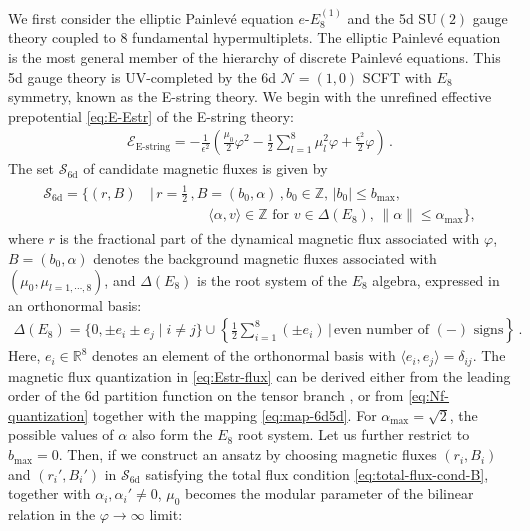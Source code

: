 \documentclass[11pt, a4paper]{article}
\theoremstyle{definition}
\begin{document}
We first consider the elliptic Painlev\'e equation $ e\text{-}E_8^{(1)} $ and the 5d $ \mathrm{SU}(2) $ gauge theory coupled to 8 fundamental hypermultiplets. The elliptic Painlev\'e equation is the most general member of the hierarchy of discrete Painlev\'e equations. This 5d gauge theory is UV-completed by the 6d $ \mathcal{N}=(1,0) $ SCFT with $ E_8 $ symmetry, known as the E-string theory. We begin with the unrefined effective prepotential \eqref{eq:E-Estr} of the E-string theory:
\begin{align}\label{eq:E-Estr2}
    \mathcal{E}_{\text{E-string}} = -\frac{1}{\epsilon^2} \left( \frac{\mu_0}{2} \varphi^2 - \frac{1}{2} \sum_{l=1}^8 \mu_l^2 \varphi + \frac{\epsilon^2}{2} \varphi \right) \, .
\end{align}
The set $ \mathcal{S}_{\text{6d}} $ of candidate magnetic fluxes is given by
\begin{align}\label{eq:Estr-flux}
    \begin{aligned}
        \mathcal{S}_{\text{6d}} = \bigg\{ (r, B) \, &\bigg| \, r = \frac{1}{2} \, , B=(b_0, \alpha) \, , b_0 \in \mathbb{Z} , \, |b_0| \leq b_{\mathrm{max}}, \\
        &\qquad \qquad \, \langle \alpha, v \rangle \in \mathbb{Z} \text{ for } v \in \Delta(E_8) , \, \lVert \alpha \rVert \leq \alpha_{\mathrm{max}} \bigg\} ,
    \end{aligned}
\end{align}
where $ r $ is the fractional part of the dynamical magnetic flux associated with $ \varphi $, $ B=(b_0, \alpha) $ denotes the background magnetic fluxes associated with $ (\mu_0, \mu_{l=1,\cdots,8}) $, and $ \Delta(E_8) $ is the root system of the $ E_8 $ algebra, expressed in an orthonormal basis:
\begin{align}
    \Delta(E_8) = \{ 0, \pm e_i \pm e_j \mid i\neq j \} \cup \left\{ \frac{1}{2} \sum_{i=1}^8 (\pm e_i ) \,\bigg|\, \text{even number of }(-) \text{ signs} \right\} \, .
\end{align}
Here, $ e_i \in \mathbb{R}^8 $ denotes an element of the orthonormal basis with $ \langle e_i, e_j \rangle = \delta_{ij} $. The magnetic flux quantization in \eqref{eq:Estr-flux} can be derived either from the leading order of the 6d partition function on the tensor branch \cite{Huang:2017mis, Kim:2020hhh, Kim:2014dza}, or from \eqref{eq:Nf-quantization} together with the mapping \eqref{eq:map-6d5d}. For $ \alpha_{\mathrm{max}}=\sqrt{2} $, the possible values of $ \alpha $ also form the $ E_8 $ root system. Let us further restrict to $ b_{\mathrm{max}}=0 $. Then, if we construct an ansatz by choosing magnetic fluxes $ (r_i,B_i) $ and $ (r_i',B_i') $ in $ \mathcal{S}_{\text{6d}} $ satisfying the total flux condition \eqref{eq:total-flux-cond-B}, together with $ \alpha_i, \alpha_i' \neq 0 $, $ \mu_0 $ becomes the modular parameter of the bilinear relation in the $ \varphi\to \infty $ limit:
\end{document}
